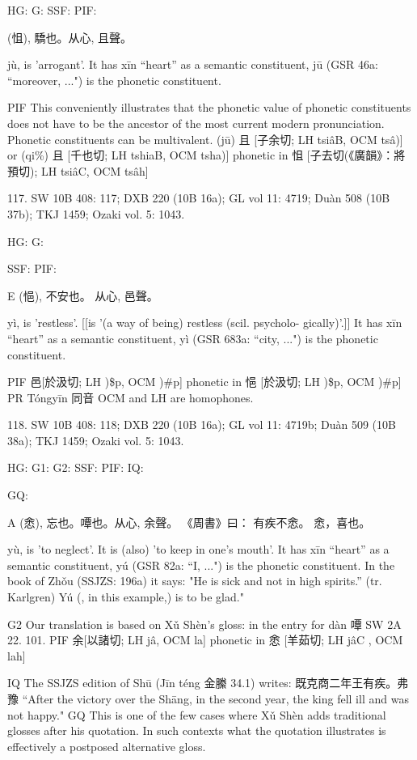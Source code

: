 HG:
G: SSF: PIF:

  (怚),
驕也。从心, 且聲。


jù,
is 'arrogant'.
It has xīn ``heart'' as a semantic constituent,
jū (GSR 46a: ``moreover, ...") is the phonetic constituent.

PIF This conveniently illustrates that the phonetic value of phonetic constituents does not have to be the ancestor of the most current modern pronunciation. Phonetic constituents can be multivalent.
(jū) 且 [子余切; LH tsiâB, OCM tsâ)] or (qi\%) 且 [千也切; LH tshiaB, OCM tsha)] phonetic in
怚 [子去切(《廣韻》：將預切); LH tsiâC, OCM tsâh]

117. SW 10B 408: 117; DXB 220 (10B 16a); GL vol 11: 4719; Duàn 508 (10B 37b); TKJ 1459; Ozaki vol. 5: 1043.


HG:
G:

SSF: PIF:

E (悒),
不安也。
从心, 邑聲。


yì,
is 'restless'. [[is '(a way of being) restless (scil. psycholo- gically)'.]]
It has xīn ``heart'' as a semantic constituent,
yì (GSR 683a: ``city, ...") is the phonetic constituent.

PIF     邑[於汲切; LH )\$p, OCM )\#p] phonetic in 悒 [於汲切; LH )\$p, OCM )\#p]
PR	Tóngyīn 同音 OCM and LH are homophones.

118. SW 10B 408: 118; DXB 220 (10B 16a); GL vol 11: 4719b; Duàn 509 (10B 38a); TKJ 1459; Ozaki vol. 5: 1043.


HG:
G1:
G2: SSF: PIF: IQ:

GQ:

A (悆),
忘也。嘾也。从心, 余聲。
《周書》曰： 有疾不悆。 悆，喜也。


yù,
is 'to neglect'.
It is (also) 'to keep in one's mouth'.
It has xīn ``heart'' as a semantic constituent,
yú (GSR 82a: ``I, ...") is the phonetic constituent.
In the book of Zhǒu (SSJZS: 196a) it says:
"He is sick and not in high spirits.'' (tr. Karlgren) Yú (, in this example,) is to be glad."

G2	Our translation is based on Xǔ Shèn's gloss: in the entry for dàn 嘾 SW 2A 22. 101.
PIF     余[以諸切; LH jâ, OCM la] phonetic in 悆 [羊茹切; LH jâC , OCM lah]



IQ	The SSJZS edition of Shū (Jīn téng 金縢 34.1) writes: 既克商二年王有疾。弗豫 ``After the victory over the Shāng, in the second year, the king fell ill and was not happy."
GQ This is one of the few cases where Xǔ Shèn adds traditional glosses after his quotation. In such contexts what the quotation illustrates is effectively a postposed alternative gloss.


